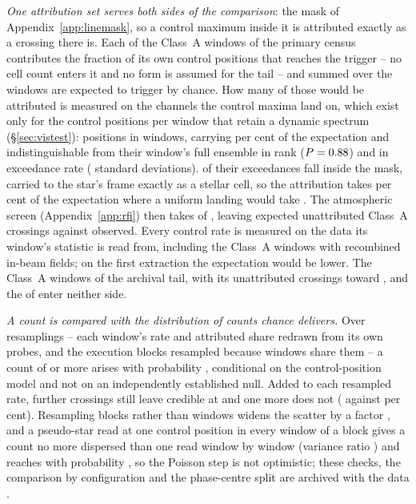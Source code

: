 \emph{One attribution set serves both sides of the comparison}: the mask of
Appendix~\ref{app:linemask}, so a control maximum inside it is attributed
exactly as a crossing there is. Each of the \CeNWin{} Class~A windows of the
primary census contributes the fraction of its own \NCtrl{} control positions
that reaches the trigger -- no cell count enters it and no form is assumed
for the tail -- and summed over the windows \CeExpTrig{} are expected to
trigger by chance. How many of those would be attributed is measured on the
channels the control maxima land on, which exist only for the \RcNRetCtrl{}
control positions per window that retain a dynamic spectrum
(\S\ref{sec:vistest}): \CeNExcPos{} positions in \CeNExcWin{} windows,
carrying \CeExcCovPct{} per cent of the expectation and indistinguishable from
their window's full ensemble in rank ($P=0.88$) and in exceedance rate
(\CeRetZ{} standard deviations). \CeNExcAttr{} of their \CeNExc{} exceedances
fall inside the mask, carried to the star's frame exactly as a stellar cell,
so the attribution takes \CeMaskPct{} per cent of the expectation where a
uniform landing would take \CeUnifPct. The atmospheric screen
(Appendix~\ref{app:rfi}) then takes \CeTlCtrlCut{} of \CeTlCtrlSurv, leaving
\CeExp{} expected unattributed Class~A crossings against \CeObs{} observed.
Every control rate is measured on the data its window's statistic is read
from, including the \CeNRepWinA{} Class~A windows with recombined in-beam
fields; on the first extraction the expectation would be \CeRepDExp{} lower.
The \CeNWinTail{} Class~A windows of the archival tail, with its
\CeNTailCrossWord{} unattributed crossings toward \CeTailStar, and the
\CeNWinComp{} of \OmXStar{} enter neither side.

\emph{A count is compared with the distribution of counts chance delivers.}
Over \CeNBoot{} resamplings -- each window's rate and attributed share redrawn
from its own probes, and the execution blocks resampled because windows share
them -- a count of \CeObs{} or more arises with probability \CeProbNull{},
conditional on the control-position model and not on an independently
established null. Added to each resampled rate, \CeAddLim{} further crossings
still leave \CeObs{} credible at \CeProbAtLim{} and one more does not
(\CeProbAboveLim{} against \CeAlphaPct{} per cent). Resampling blocks rather
than windows widens the scatter by a factor \BgBlockSdRatio, and a pseudo-star
read at one control position in every window of a block gives a count no more
dispersed than one read window by window (variance ratio \BgDisp) and reaches
\CeObs{} with probability \BgPseudoP, so the Poisson step is not optimistic;
these checks, the comparison by configuration and the phase-centre split are
archived with the data \citep{SIdeposit}.

